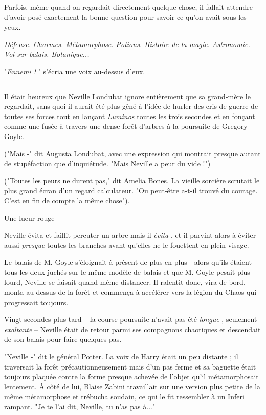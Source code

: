 Parfois, même quand on regardait directement quelque chose, il fallait attendre d'avoir posé exactement la bonne question pour savoir ce qu'on avait sous les yeux.

\emph{Défense. Charmes. Métamorphose. Potions. Histoire de la magie. Astronomie. Vol sur balais. Botanique...} 

"\emph{Ennemi !} " s'écria une voix au-dessus d'eux.
\par\noindent\rule{\textwidth}{0.4pt}
Il était heureux que Neville Londubat ignore entièrement que sa grand-mère le regardait, sans quoi il aurait été plus gêné à l'idée de hurler des cris de guerre de toutes ses forces tout en lançant \emph{Luminos}  toutes les trois secondes et en fonçant comme une fusée à travers une dense forêt d'arbres à la poursuite de Gregory Goyle.

("Mais -" dit Augusta Londubat, avec une expression qui montrait presque autant de stupéfaction que d'inquiétude. "Mais Neville a peur du vide !")

("Toutes les peurs ne durent pas," dit Amelia Bones. La vieille sorcière scrutait le plus grand écran d'un regard calculateur. "Ou peut-être a-t-il trouvé du courage. C'est en fin de compte la même chose").

Une lueur rouge -

Neville évita et faillit percuter un arbre mais il \emph{évita} , et il parvint alors à éviter aussi \emph{presque}  toutes les branches avant qu'elles ne le fouettent en plein visage.

Le balais de M. Goyle s'éloignait à présent de plus en plus - alors qu'ils étaient tous les deux juchés sur le même modèle de balais et que M. Goyle pesait plus lourd, Neville se faisait quand même distancer. Il ralentit donc, vira de bord, monta au-dessus de la forêt et commença à accélérer vers la légion du Chaos qui progressait toujours.

Vingt secondes plus tard – la course poursuite n'avait pas été \emph{longue} , seulement \emph{exaltante}  – Neville était de retour parmi ses compagnons chaotiques et descendait de son balais pour faire quelques pas.

"Neville -" dit le général Potter. La voix de Harry était un peu distante ; il traversait la forêt précautionneusement mais d'un pas ferme et sa baguette était toujours plaquée contre la forme presque achevée de l'objet qu'il métamorphosait lentement. À côté de lui, Blaise Zabini travaillait sur une version plus petite de la même métamorphose et trébucha soudain, ce qui le fit ressembler à un Inferi rampant. "Je te l'ai dit, Neville, tu n'as pas à..."

